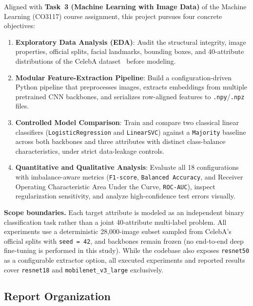 \documentclass[12pt,a4paper]{article}
\newcommand{\code}[1]{\texttt{#1}}
\begin{document}
Aligned with \textbf{Task~3 (Machine Learning with Image Data)} of the Machine Learning (CO3117) course assignment, this project pursues four concrete objectives:
\begin{enumerate}[leftmargin=20pt, itemsep=2pt]
  \item \textbf{Exploratory Data Analysis (EDA)}: Audit the structural integrity, image properties, official splits, facial landmarks, bounding boxes, and 40-attribute distributions of the CelebA dataset~\cite{liu2015celeba} before modeling.
  \item \textbf{Modular Feature-Extraction Pipeline}: Build a configuration-driven Python pipeline that preprocesses images, extracts embeddings from multiple pretrained CNN backbones, and serializes row-aligned features to \code{.npy}/\code{.npz} files.
  \item \textbf{Controlled Model Comparison}: Train and compare two classical linear classifiers (\code{LogisticRegression} and \code{LinearSVC}) against a \code{Majority} baseline across both backbones and three attributes with distinct class-balance characteristics, under strict data-leakage controls.
  \item \textbf{Quantitative and Qualitative Analysis}: Evaluate all 18 configurations with imbalance-aware metrics (\code{F1-score}, \code{Balanced Accuracy}, and Receiver Operating Characteristic Area Under the Curve, \code{ROC-AUC}), inspect regularization sensitivity, and analyze high-confidence test errors visually.
\end{enumerate}

\textbf{Scope boundaries.} Each target attribute is modeled as an independent binary classification task rather than a joint 40-attribute multi-label problem. All experiments use a deterministic 28,000-image subset sampled from CelebA's official splits with \code{seed = 42}, and backbones remain frozen (no end-to-end deep fine-tuning is performed in this study). While the codebase also exposes \code{resnet50} as a configurable extractor option, all executed experiments and reported results cover \code{resnet18} and \code{mobilenet\_\allowbreak{}v3\_\allowbreak{}large} exclusively.

\subsection{Report Organization}
\label{subsec:organization}
\end{document}
